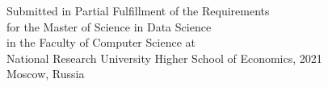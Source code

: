 \vspace{20mm}

\begin{center}
Submitted in Partial Fulfillment of the Requirements\\
for the Master of Science in Data Science\\
in the Faculty of Computer Science at\\
National Research University Higher School of Economics, 2021\\

\vspace{20mm}
Moscow, Russia


\end{center}

